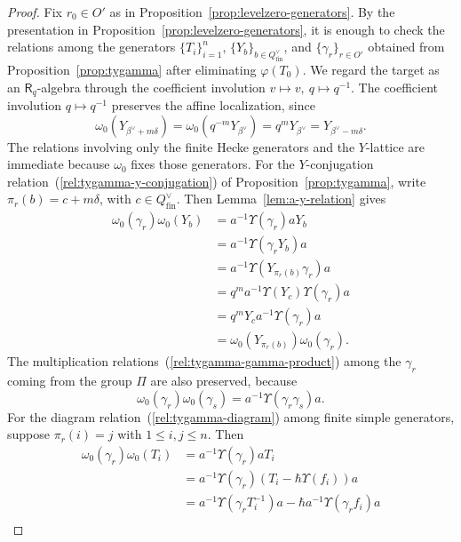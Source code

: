 \documentclass{amsart}
\newcommand{\Ring}{\mathsf{R}}
\theoremstyle{definition}
\numberwithin{equation}{section}
\begin{document}
\begin{proof}
    Fix \(r_0\in O'\) as in Proposition~\ref{prop:levelzero-generators}.
    By the presentation in Proposition~\ref{prop:levelzero-generators}, it is
    enough to check the relations among the generators $\{T_i\}_{i=1}^n$,
    $\{Y_b\}_{b\in Q_{\mathrm{fin}}^\vee}$, and $\{\gamma_r\}_{r\in O'}$ obtained from
    Proposition~\ref{prop:tygamma} after eliminating \(\varphi(T_0)\).
    We regard the target as an \(\Ring_q\)-algebra through the coefficient
    involution \(v\mapsto v,\ q\mapsto q^{-1}\).
    The coefficient involution \(q\mapsto q^{-1}\) preserves the affine
    localization, since
    \[
    \omega_0(Y_{\beta^\vee+m\delta})
    =
    \omega_0(q^{-m}Y_{\beta^\vee})
    =
    q^mY_{\beta^\vee}
    =
    Y_{\beta^\vee-m\delta}.
    \]
    The relations involving only the finite Hecke generators and the $Y$-lattice
    are immediate because $\omega_0$ fixes those generators. For the
    \(Y\)-conjugation relation~(\ref{rel:tygamma-y-conjugation}) of
    Proposition~\ref{prop:tygamma}, write
    \(\pi_r(b)=c+m\delta\), with \(c\in Q_{\mathrm{fin}}^\vee\).
    Then Lemma~\ref{lem:a-y-relation} gives
    \begin{align*}
        \omega_0(\gamma_r)\omega_0(Y_b) & = a^{-1}\Upsilon(\gamma_r)aY_b\\
        & = a^{-1}\Upsilon(\gamma_rY_b)a\\
        & = a^{-1}\Upsilon(Y_{\pi_r(b)}\gamma_r)a\\
        & = q^m a^{-1}\Upsilon(Y_c)\Upsilon(\gamma_r)a\\
        & = q^mY_c a^{-1}\Upsilon(\gamma_r)a\\
        & = \omega_0(Y_{\pi_r(b)})\omega_0(\gamma_r).
    \end{align*}
    The multiplication relations~(\ref{rel:tygamma-gamma-product}) among the $\gamma_r$ coming from the group
    $\Pi$ are also preserved, because
    \[
    \omega_0(\gamma_r)\omega_0(\gamma_s)
    =
    a^{-1}\Upsilon(\gamma_r\gamma_s)a.
    \]
    For the diagram relation~(\ref{rel:tygamma-diagram}) among finite simple generators, suppose
    $\pi_r(i)=j$ with $1\leqslant i,j\leqslant n$. Then
    \begin{align*}
        \omega_0(\gamma_r)\omega_0(T_i) & = a^{-1}\Upsilon(\gamma_r)aT_i\\
        & = a^{-1}\Upsilon(\gamma_r)(T_i - \hbar \Upsilon(f_i))a\\
        & = a^{-1}\Upsilon(\gamma_rT_i^{-1})a - \hbar a^{-1}\Upsilon(\gamma_rf_i)a\\

\end{align*}
\end{proof}
\end{document}
